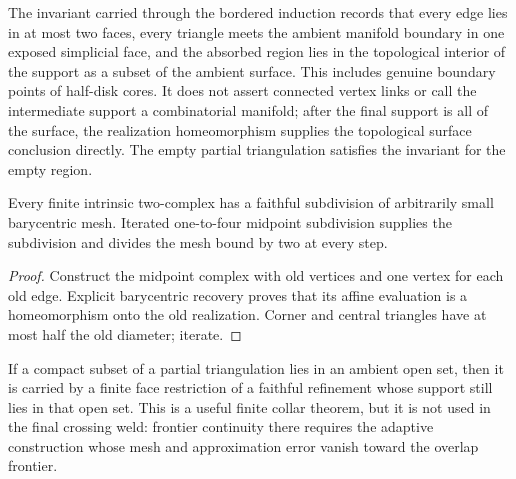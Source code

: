 \begin{definition}
\label{moise:def:rado_invariant}
\leanok
{}
The invariant carried through the bordered induction records that every edge
lies in at most two faces, every triangle meets the ambient manifold boundary
in one exposed simplicial face, and the absorbed region lies in the
topological interior of the support as a subset of the ambient surface.  This
includes genuine boundary points of half-disk cores.  It does not assert
connected vertex links or call the intermediate support a combinatorial
manifold; after the final support is all of the surface, the realization
homeomorphism supplies the topological surface conclusion directly.  The
empty partial triangulation satisfies the invariant for the empty region.
\end{definition}

\begin{lemma}
\label{moise:lem:intrinsic_fine_subdivision}
\leanok
{}
Every finite intrinsic two-complex has a faithful subdivision of arbitrarily
small barycentric mesh.  Iterated one-to-four midpoint subdivision supplies
the subdivision and divides the mesh bound by two at every step.
\end{lemma}

\begin{proof}
\leanok
Construct the midpoint complex with old vertices and one vertex for each old
edge.  Explicit barycentric recovery proves that its affine evaluation is a
homeomorphism onto the old realization.  Corner and central triangles have at
most half the old diameter; iterate.
\end{proof}

\begin{lemma}
\label{moise:lem:finite_compact_collar}
\leanok
{}
If a compact subset of a partial triangulation lies in an ambient open set,
then it is carried by a finite face restriction of a faithful refinement whose
support still lies in that open set.  This is a useful finite collar theorem,
but it is not used in the final crossing weld: frontier continuity there
requires the adaptive construction whose mesh and approximation error vanish
toward the overlap frontier.
\end{lemma}

